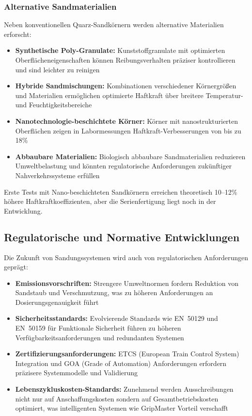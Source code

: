 \documentclass[a4paper,12pt]{article}
\theoremstyle{definition}
\begin{document}
\subsubsection{Alternative Sandmaterialien}

Neben konventionellen Quarz-Sandkörnern werden alternative Materialien erforscht:

\begin{itemize}
	\item \textbf{Synthetische Poly-Granulate:} Kunststoffgranulate mit optimierten Oberflächeneigenschaften können Reibungsverhalten präziser kontrollieren und sind leichter zu reinigen
	\item \textbf{Hybride Sandmischungen:} Kombinationen verschiedener Körnergrößen und Materialien ermöglichen optimierte Haftkraft über breitere Temperatur- und Feuchtigkeitsbereiche
	\item \textbf{Nanotechnologie-beschichtete Körner:} Körner mit nanostrukturierten Oberflächen zeigen in Labormessungen Haftkraft-Verbesserungen von bis zu 18\%
	\item \textbf{Abbaubare Materialien:} Biologisch abbaubare Sandmaterialien reduzieren Umweltbelastung und könnten regulatorische Anforderungen zukünftiger Nahverkehrssysteme erfüllen
\end{itemize}

Erste Tests mit Nano-beschichteten Sandkörnern erreichen theoretisch 10--12\% höhere Haftkraftkoeffizienten, aber die Serienfertigung liegt noch in der Entwicklung.

\subsection{Regulatorische und Normative Entwicklungen}

Die Zukunft von Sandungssystemen wird auch von regulatorischen Anforderungen geprägt:

\begin{itemize}
	\item \textbf{Emissionsvorschriften:} Strengere Umweltnormen fordern Reduktion von Sandstaub und Verschmutzung, was zu höheren Anforderungen an Dosierungsgenauigkeit führt
	\item \textbf{Sicherheitsstandards:} Evolvierende Standards wie EN~50129 und EN~50159 für Funktionale Sicherheit führen zu höheren Verfügbarkeitsanforderungen und redundanten Systemen
	\item \textbf{Zertifizierungsanforderungen:} ETCS (European Train Control System) Integration und GOA (Grade of Automation) Anforderungen erfordern präzisere Systemmodelle und Validierung
	\item \textbf{Lebenszykluskosten-Standards:} Zunehmend werden Ausschreibungen nicht nur auf Anschaffungskosten sondern auf Gesamtbetriebskosten optimiert, was intelligenten Systemen wie GripMaster Vorteil verschafft
\end{itemize}
\end{document}
